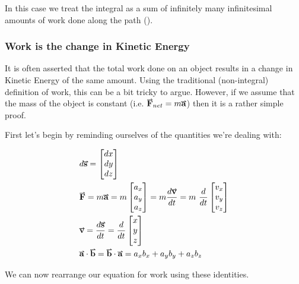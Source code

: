 \documentclass[main.tex]{subfiles}
\begin{document}
                    In this case we treat the integral as a sum of infinitely many infinitesimal amounts of work done along the path ().

                    \newpage
                    \subsubsection{Work is the change in Kinetic Energy}
                        \label{subsubsec: Work is the change in Kinetic Energy}

                        It is often asserted that the total work done on an object results in a change in Kinetic Energy of the same amount. Using the traditional (non-integral) definition of work, this can be a bit tricky to argue. However, if we assume that the mass of the object is constant (i.e. $\vect{F}_{net} = m\vect{a}$) then it is a rather simple proof.

                        First let's begin by reminding ourselves of the quantities we're dealing with:

                        \begin{align*}
                            &d\vect{s} = \Matrix{dx\\dy\\dz}\\
                            &\vect{F} = m\vect{a} = m\Matrix{a_x\\a_y\\a_z} = m\frac{d\vect{v}}{dt} = m\ \frac{d}{dt}\Matrix{v_x\\v_y\\v_z}\\
                            &\vect{v} = \frac{d\vect{s}}{dt} = \frac{d}{dt}\Matrix{x\\y\\z}\\
                            &\vect{a} \cdot \vect{b} = \vect{b} \cdot \vect{a} = a_xb_x + a_yb_y + a_zb_z
                        \end{align*}

                        We can now rearrange our equation for work using these identities.
\end{document}
